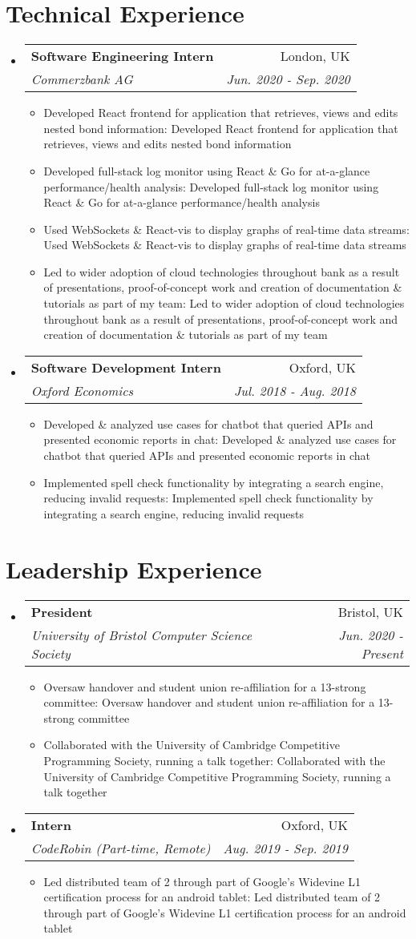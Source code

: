 \documentclass[a4paper,11pt]{article}
\makeatletter
\def \ifempty#1{\def\temp{#1} \ifx\temp\empty }
\newcommand{\resumeItem}[2]{
  \item\small{
  	\ifempty{#1}#2\else\textbf{#1}{: #2 \vspace{-2pt}}\fi
  }
}
\newcommand{\resumeSubheading}[4]{
  \vspace{-1pt}\item
    \begin{tabular*}{0.97\textwidth}{l@{\extracolsep{\fill}}r}
      \textbf{#1} & #2 \\
      \textit{\small#3} & \textit{\small #4} \\
    \end{tabular*}\vspace{-5pt}
}
\newcommand{\resumeSubHeadingListStart}{\begin{itemize}[leftmargin=*]}
\newcommand{\resumeSubHeadingListEnd}{\end{itemize}}
\newcommand{\resumeItemListStart}{\begin{itemize}}
\newcommand{\resumeItemListEnd}{\end{itemize}\vspace{-5pt}}
\makeatother
\begin{document}
\section{Technical Experience}
  \resumeSubHeadingListStart
    \resumeSubheading
      {Software Engineering Intern}{London, UK}
      {Commerzbank AG}{Jun. 2020 - Sep. 2020}
      \resumeItemListStart
      	\resumeItem{}
          {Developed React frontend for application that retrieves, views and edits nested bond information}
        \resumeItem{}
          {Developed full-stack log monitor using React \& Go for at-a-glance performance/health analysis}
        \resumeItem{}
          {Used WebSockets \& React-vis to display graphs of real-time data streams}
        \resumeItem{}
          {Led to wider adoption of cloud technologies throughout bank as a result of presentations, proof-of-concept work and creation of documentation \& tutorials as part of my team}
      \resumeItemListEnd
    \resumeSubheading
      {Software Development Intern}{Oxford, UK}
      {Oxford Economics}{Jul. 2018 - Aug. 2018}
      \resumeItemListStart
      	\resumeItem{}
          {Developed \& analyzed use cases for chatbot that queried APIs and presented economic reports in chat}
        \resumeItem{}  
          {Implemented spell check functionality by integrating a search 
          engine, reducing invalid requests}
      \resumeItemListEnd
  \resumeSubHeadingListEnd


\section{Leadership Experience}
  \resumeSubHeadingListStart
    \resumeSubheading
      {President}{Bristol, UK}
      {University of Bristol Computer Science Society}{Jun. 2020 - Present}
      \resumeItemListStart
        \resumeItem{}
          {Oversaw handover and student union re-affiliation for a 13-strong committee}
        \resumeItem{}
          {Collaborated with the University of Cambridge Competitive Programming Society, running a talk together}
      \resumeItemListEnd
    \resumeSubheading
      {Intern}{Oxford, UK}
      {CodeRobin (Part-time, Remote)}{Aug. 2019 - Sep. 2019}
      \resumeItemListStart
      	\resumeItem{}
          {Led distributed team of 2 through part of Google's Widevine L1 certification process for an android tablet}
      \resumeItemListEnd
  \resumeSubHeadingListEnd


\end{document}
